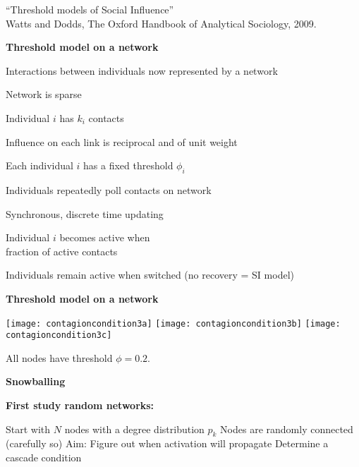       ``Threshold models of Social Influence''\cite{watts2009a}\\
      Watts and Dodds, The Oxford Handbook of Analytical Sociology, 2009.
    
  



  \textbf{Threshold model on a network}

  
  
   
    Interactions between individuals 
    now represented by a network
   
    Network is \alert{sparse}
   
    Individual $i$ has $k_i$ contacts
   
    Influence on each link is \alert{reciprocal} and of \alert{unit weight}
   
    Each individual $i$ has a fixed threshold $\phi_i$
   
    Individuals repeatedly poll contacts on network
   
    Synchronous, discrete time updating 
   
    Individual $i$ becomes active when\\
    fraction of active contacts 
   
    Individuals remain active when switched (no recovery = SI model)
  
  






  \textbf{Threshold model on a network}

  
    \begin{center}
      \texttt{[image: contagioncondition3a]}%
      \texttt{[image: contagioncondition3b]}%
      \texttt{[image: contagioncondition3c]}%
    \end{center}

    
     All nodes have threshold $\phi=0.2$.
    
  





  \textbf{Snowballing}

  \textbf{First study random networks:}
    
     Start with $N$ nodes with a degree distribution $p_k$
     Nodes are randomly connected (carefully so)
     Aim: Figure out when activation will propagate
     Determine a \alert{cascade condition}
    

